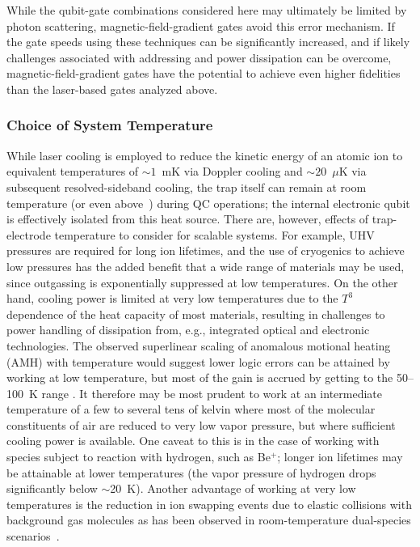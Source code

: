 \documentclass[%
12pt,
 amsmath,amssymb,
]{revtex4-2}
\begin{document}
While the qubit-gate combinations considered here may ultimately be limited by photon scattering, magnetic-field-gradient gates avoid this error mechanism.  If the gate speeds using these techniques can be significantly increased, and if likely challenges associated with addressing and power dissipation can be overcome, magnetic-field-gradient gates have the potential to achieve even higher fidelities than the laser-based gates analyzed above.

\subsubsection{Choice of System Temperature}

While laser cooling is employed to reduce the kinetic energy of an atomic ion to equivalent temperatures of ${\sim}1$~mK via Doppler cooling and ${\sim}20$~$\mu$K via subsequent resolved-sideband cooling, the trap itself can remain at room temperature (or even above~\cite{UCB_heater_heating_rates_2018}) during QC operations; the internal electronic qubit is effectively isolated from this heat source.  There are, however, effects of trap-electrode temperature to consider for scalable systems.  For example, UHV pressures are required for long ion lifetimes, and the use of cryogenics to achieve low pressures has the added benefit that a wide range of materials may be used, since outgassing is exponentially suppressed at low temperatures.  On the other hand, cooling power is limited at very low temperatures due to the $T^{3}$ dependence of the heat capacity of most materials, resulting in challenges to power handling of dissipation from, e.g., integrated optical and electronic technologies.  The observed superlinear scaling of anomalous motional heating (AMH) with temperature would suggest lower logic errors can be attained by working at low temperature, but most of the gain is accrued by getting to the 50--100~K range \cite{PhysRevA.89.012318_2014}.  It therefore may be most prudent to work at an intermediate temperature of a few to several tens of kelvin where most of the molecular constituents of air are reduced to very low vapor pressure, but where sufficient cooling power is available.  One caveat to this is in the case of working with species subject to reaction with hydrogen, such as Be$^{+}$; longer ion lifetimes may be attainable at lower temperatures (the vapor pressure of hydrogen drops significantly below ${\sim}$20~K).  Another advantage of working at very low temperatures is the reduction in ion swapping events due to elastic collisions with background gas molecules as has been observed in room-temperature dual-species scenarios~\cite{BallanceHybridLogic2015}.
\end{document}
